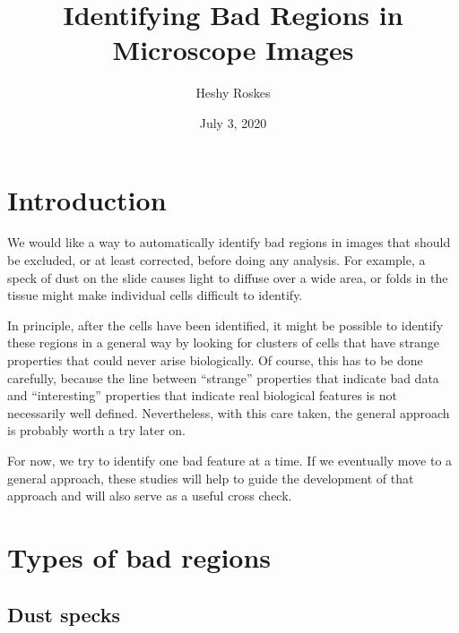 \documentclass{article}
\begin{document}
	
\title{Identifying Bad Regions in Microscope Images}
\author{Heshy Roskes}
\date{July 3, 2020}

\section{Introduction}

We would like a way to automatically identify bad regions in images that should be excluded, or at least corrected, before doing any analysis.  For example, a speck of dust on the slide causes light to diffuse over a wide area, or folds in the tissue might make individual cells difficult to identify.

In principle, after the cells have been identified, it might be possible to identify these regions in a general way by looking for clusters of cells that have strange properties that could never arise biologically.  Of course, this has to be done carefully, because the line between ``strange'' properties that indicate bad data and ``interesting'' properties that indicate real biological features is not necessarily well defined.  Nevertheless, with this care taken, the general approach is probably worth a try later on.

For now, we try to identify one bad feature at a time.  If we eventually move to a general approach, these studies will help to guide the development of that approach and will also serve as a useful cross check.

\section{Types of bad regions}

\subsection{Dust specks}
\end{document}
